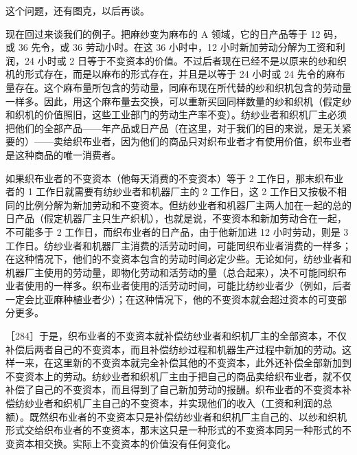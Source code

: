 这个问题，还有图克，以后再谈。

现在回过来谈我们的例子。把麻纱变为麻布的 A 领域，它的日产品等于 12 码，或 36 先令，或 36 劳动小时。在这 36 小时中，12 小时新加劳动分解为工资和利润，24 小时或 2 日等于不变资本的价值。不过后者现在已经不是以原来的纱和织机的形式存在，而是以麻布的形式存在，并且是以等于 24 小时或 24 先令的麻布量存在。这个麻布量所包含的劳动量，同麻布现在所代替的纱和织机包含的劳动量一样多。因此，用这个麻布量去交换，可以重新买回同样数量的纱和织机（假定纱和织机的价值照旧，这些工业部门的劳动生产率不变）。纺纱业者和织机厂主必须把他们的全部产品——年产品或日产品（在这里，对于我们的目的来说，是无关紧要的）——卖给织布业者，因为他们的商品只对织布业者才有使用价值，织布业者是这种商品的唯一消费者。

如果织布业者的不变资本（他每天消费的不变资本）等于 2 工作日，那末织布业者的 1 工作日就需要有纺纱业者和机器厂主的 2 工作日，这 2 工作日又按极不相同的比例分解为新加劳动和不变资本。但纺纱业者和机器厂主两人加在一起的总的日产品（假定机器厂主只生产织机），也就是说，不变资本和新加劳动合在一起，不可能多于 2 工作日，而织布业者的日产品，由于他新加进 12 小时劳动，则是 3 工作日。纺纱业者和机器厂主消费的活劳动时间，可能同织布业者消费的一样多；在这种情况下，他们的不变资本包含的劳动时间必定少些。无论如何，纺纱业者和机器厂主使用的劳动量，即物化劳动和活劳动的量（总合起来），决不可能同织布业者使用的一样多。织布业者使用的活劳动时间，可能比纺纱业者少（例如，后者一定会比亚麻种植业者少）；在这种情况下，他的不变资本就会超过资本的可变部分更多。

［284］于是，织布业者的不变资本就补偿纺纱业者和织机厂主的全部资本，不仅补偿后两者自己的不变资本，而且补偿纺纱过程和机器生产过程中新加的劳动。这样一来，在这里新的不变资本就完全补偿其他的不变资本，此外还补偿全部新加到不变资本上的劳动。纺纱业者和织机厂主由于把自己的商品卖给织布业者，就不仅补偿了自己的不变资本，而且得到了自己新加劳动的报酬。织布业者的不变资本补偿纺纱业者和织机厂主自己的不变资本，并实现他们的收入（工资和利润的总额）。既然织布业者的不变资本只是补偿纺纱业者和织机厂主自己的、以纱和织机形式交给织布业者的不变资本，那末这只是一种形式的不变资本同另一种形式的不变资本相交换。实际上不变资本的价值没有任何变化。

